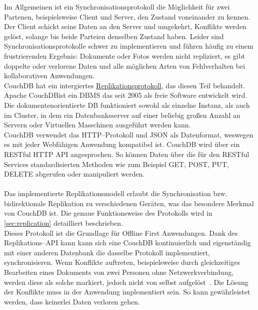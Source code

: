 Im Allgemeinen ist ein Synchronisationsprotokoll die Möglichkeit für zwei Partenen, beispielsweise Client und Server, den Zustand voneinander zu kennen. Der Client schickt seine Daten an den Server und umgekehrt, Konflikte werden gelöst, solange bis beide Parteien denselben Zustand haben.
Leider sind Synchronisationsprotokolle schwer zu implementieren und führen häufig zu einem frustrierenden Ergebnis: Dokumente oder Fotos werden nicht repliziert, es gibt doppelte oder verlorene Daten und alle möglichen Arten von Fehlverhalten bei kollaborativen Anwendungen.\\
CouchDB hat ein intergiertes \hyperref[sec:replication]{Replikationsprotokoll}, das diesen Teil behandelt.  
%
%
Apache CouchDB\tm ist ein \gls{DBMS} das seit 2005 als freie Software entwickelt wird. Die dokumentenorientierte \gls{DB} funktioniert sowohl als einzelne Instanz, als auch im Cluster, in dem ein Datenbanksserver auf einer beliebig großen Anzahl an Servern oder Virtuellen Masschinen ausgeführt werden kann.\\
CouchDB verwendet das \gls{HTTP}--Protokoll und \gls{JSON} als Datenformat, weswegen es mit jeder Webfähigen Anwendung kompatibel ist. CouchDB wird über ein \gls{REST}ful \gls{HTTP} \gls{API} angesprochen. So können Daten über die für den \gls{REST}ful Services standardisierten Methoden wie zum Beispiel GET, POST, PUT, DELETE abgerufen oder manipuliert werden.\\\\
Das implementierte Replikationsmodell erlaubt die Synchronisation bzw. bidirektionale Replikation zu verschiedenen Geräten, was das besondere Merkmal von CouchDB ist. 
Die genaue Funktionsweise des Protokolls wird in \autoref{sec:replication} detailliert beschrieben.\\
Dieses Protokoll ist die Grundlage für Offline First Anwendungen.
Dank des Replikations--\gls{API} kann kann sich eine CouchDB kontinuierlich und eigenständig mit einer anderen Datenbank die dasselbe Protokoll implementiert, synchronisieren.
Wenn Konflikte auftreten, beispielsweise durch gleichzeitiges Bearbeiten eines Dokuments von zwei Personen ohne Netzwerkverbindung, werden diese als solche markiert, jedoch nicht von selbst aufgelöst~\cite{couch}. Die Lösung der Konflikte muss in der Anwendung implementiert sein.
So kann gewährleistet werden, dass keinerlei Daten verloren gehen.\\\\
